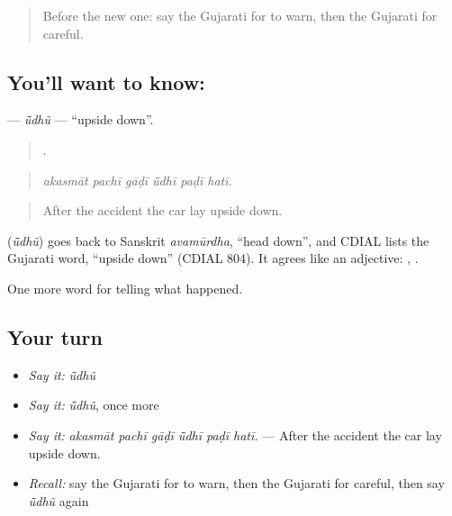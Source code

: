 \begin{quote}
Before the new one: say the Gujarati for to warn, then the Gujarati for careful.
\end{quote}

\subsection*{You'll want to know: }
\textbf{} — \emph{ū̃dhũ} — \textquotedblleft{}upside down\textquotedblright{}.

\begin{quote}
     .
\end{quote}

\begin{quote}
\emph{akasmāt pachī gāḍī ū̃dhī paḍī hatī.}
\end{quote}

\begin{quote}
After the accident the car lay upside down.
\end{quote}

\begin{cousinweb}
\textbf{} (\emph{ū̃dhũ}) goes back to Sanskrit \emph{avamūrdha}, \textquotedblleft{}head down\textquotedblright{}, and CDIAL lists the Gujarati word, \textquotedblleft{}upside down\textquotedblright{} (CDIAL 804). It agrees like an adjective: \textbf{ }, \textbf{ }.
\end{cousinweb}

\begin{grammarlens}[title={What you've built}]
One more word for telling what happened.
\end{grammarlens}

\subsection*{Your turn}
\begin{itemize}
\raggedright
  \item \emph{Say it:} \emph{ū̃dhũ}
  \item \emph{Say it:} \emph{ū̃dhũ}, once more
  \item \emph{Say it:} \emph{akasmāt pachī gāḍī ū̃dhī paḍī hatī.} — After the accident the car lay upside down.
  \item \emph{Recall:} say the Gujarati for to warn, then the Gujarati for careful, then say \emph{ū̃dhũ} again
\end{itemize}

